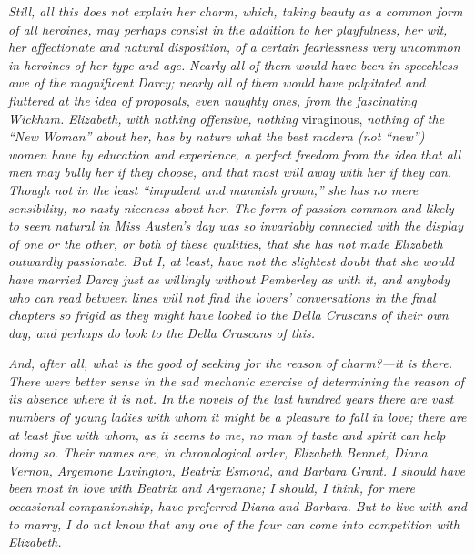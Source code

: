 \documentclass[12pt,openright]{book}
\begin{document}
\textit{Still, all this does not explain her charm, which, taking beauty as a}\textit{ }\textit{common form of all heroines, may perhaps consist in the addition to her}\textit{ }\textit{playfulness, her wit, her affectionate and natural disposition, of a}\textit{ }\textit{certain fearlessness very uncommon in heroines of her type and age.}\textit{ }\textit{Nearly all of them would have been in speechless awe of the magnificent}\textit{ }\textit{Darcy; nearly all of them would have palpitated and fluttered at the}\textit{ }\textit{idea of proposals, even naughty ones, from the fascinating Wickham.}\textit{ }\textit{Elizabeth, with nothing offensive, nothing} viraginous, \textit{nothing of the}\textit{ }\textit{“New Woman” about her, has by nature what the best modern (not “new”)}\textit{ }\textit{women have by education and experience, a perfect freedom from the idea}\textit{ }\textit{that all men may bully her if they choose, and that most will}\textit{ }\textit{away with}\textit{ }\textit{her if they can. Though not in the least “impudent and mannish grown,”}\textit{ }\textit{she has no mere sensibility, no nasty niceness about her. The form of}\textit{ }\textit{passion common and likely to seem natural in Miss Austen’s day was so}\textit{ }\textit{invariably connected with the display of one or the other, or both of}\textit{ }\textit{these qualities, that she has not made Elizabeth outwardly passionate.}\textit{ }\textit{But I, at least, have not the slightest doubt that she would have}\textit{ }\textit{married Darcy just as willingly without Pemberley as with it, and}\textit{ }\textit{anybody who can read between lines will not find the lovers’}\textit{ }\textit{conversations in the final chapters so frigid as they might have looked}\textit{ }\textit{to the Della Cruscans of their own day, and perhaps do look to the Della}\textit{ }\textit{Cruscans of this.}

\textit{And, after all, what is the good of seeking for the reason of}\textit{ }\textit{charm?—it is there. There were better sense in the sad mechanic}\textit{ }\textit{exercise of determining the reason of its absence where it is not. In}\textit{ }\textit{the novels of the last hundred years there are vast numbers of young}\textit{ }\textit{ladies with whom it might be a pleasure to fall in love; there are at}\textit{ }\textit{least five with whom, as it seems to me, no man of taste and spirit can}\textit{ }\textit{help doing so. Their names are, in chronological order, Elizabeth}\textit{ }\textit{Bennet, Diana Vernon, Argemone Lavington, Beatrix Esmond, and Barbara}\textit{ }\textit{Grant. I should have been most in love with Beatrix and Argemone; I}\textit{ }\textit{should, I think, for mere occasional companionship, have preferred Diana}\textit{ }\textit{and Barbara. But to live with and to marry, I do not know that any one}\textit{ }\textit{of the four can come into competition with Elizabeth.}
\end{document}
